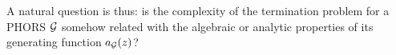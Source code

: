 A natural question is thus: is the complexity of the termination problem for a PHORS $\mathcal{G}$ somehow related with the algebraic or analytic properties of its generating function $a_{\mathcal{G}}(z)$?




%
%

%
%
%
%
%
%
%

